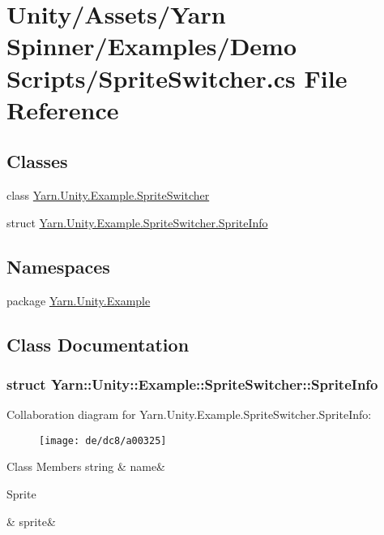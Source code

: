 \hypertarget{a00259}{\section{Unity/\-Assets/\-Yarn Spinner/\-Examples/\-Demo Scripts/\-Sprite\-Switcher.cs File Reference}
\label{a00259}
}
\subsection*{Classes}
\begin{DoxyCompactItemize}
\item 
class \hyperlink{a00137}{Yarn.\-Unity.\-Example.\-Sprite\-Switcher}
\item 
struct \hyperlink{a00137_dd/de2/a00320}{Yarn.\-Unity.\-Example.\-Sprite\-Switcher.\-Sprite\-Info}
\end{DoxyCompactItemize}
\subsection*{Namespaces}
\begin{DoxyCompactItemize}
\item 
package \hyperlink{a00309}{Yarn.\-Unity.\-Example}
\end{DoxyCompactItemize}


\subsection{Class Documentation}
\label{dd/de2/a00320}
\hypertarget{a00137_dd/de2/a00320}{}
\subsubsection{struct Yarn\-:\-:Unity\-:\-:Example\-:\-:Sprite\-Switcher\-:\-:Sprite\-Info}


Collaboration diagram for Yarn.\-Unity.\-Example.\-Sprite\-Switcher.\-Sprite\-Info\-:
\nopagebreak
\begin{figure}[H]
\begin{center}
\leavevmode
\texttt{[image: de/dc8/a00325]}
\end{center}
\end{figure}
\begin{DoxyFields}{Class Members}
\hypertarget{a00137_a3f5bca2fff413dfe075c1fcf7e58369c}{string}\label{a00137_a3f5bca2fff413dfe075c1fcf7e58369c}
&
name&
\\
\hline

\hypertarget{a00137_adc58df011dc2841837b6cf775b372061}{Sprite}\label{a00137_adc58df011dc2841837b6cf775b372061}
&
sprite&
\\
\hline

\end{DoxyFields}
